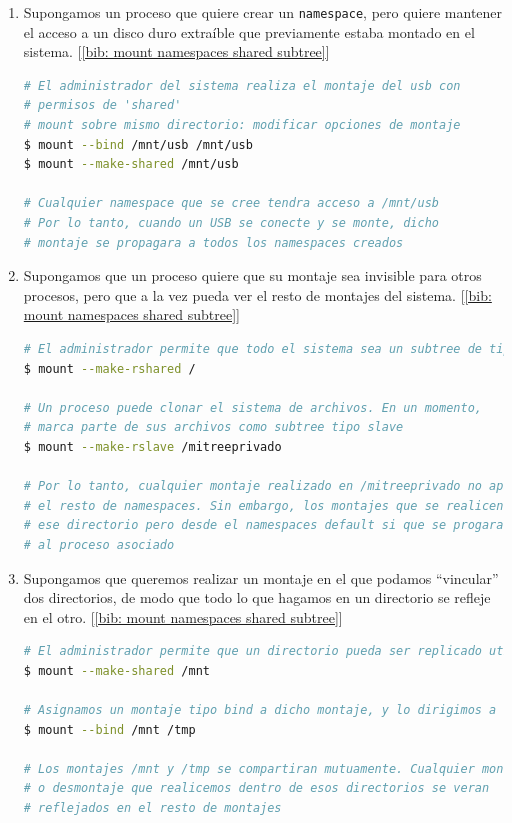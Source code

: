 \documentclass[a4paper, oneside, 12pt]{book}
\begin{document}
	\begin{enumerate}
		\item Supongamos un proceso que quiere crear un \texttt{namespace}, pero quiere mantener el acceso a un disco duro extraíble que previamente estaba montado en el sistema. [\ref{bib: mount namespaces shared subtree}]
		
		\begin{lstlisting}[language=bash, caption={Caso de uso de \texttt{shared subtree}}]
# El administrador del sistema realiza el montaje del usb con 
# permisos de 'shared'
# mount sobre mismo directorio: modificar opciones de montaje
$ mount --bind /mnt/usb /mnt/usb
$ mount --make-shared /mnt/usb
			
# Cualquier namespace que se cree tendra acceso a /mnt/usb
# Por lo tanto, cuando un USB se conecte y se monte, dicho 
# montaje se propagara a todos los namespaces creados
		\end{lstlisting}
	
		\item Supongamos que un proceso quiere que su montaje sea invisible para otros procesos, pero que a la vez pueda ver el resto de montajes del sistema. [\ref{bib: mount namespaces shared subtree}]
		
		\begin{lstlisting}[language=bash, caption={Caso de uso de \texttt{slave mount}}]
# El administrador permite que todo el sistema sea un subtree de tipo shared
$ mount --make-rshared /
			
# Un proceso puede clonar el sistema de archivos. En un momento, 
# marca parte de sus archivos como subtree tipo slave
$ mount --make-rslave /mitreeprivado
			
# Por lo tanto, cualquier montaje realizado en /mitreeprivado no aparecera en 
# el resto de namespaces. Sin embargo, los montajes que se realicen en 
# ese directorio pero desde el namespaces default si que se progaran 
# al proceso asociado
		\end{lstlisting}
	
		\item Supongamos que queremos realizar un montaje en el que podamos ``vincular'' dos directorios, de modo que todo lo que hagamos en un directorio se refleje en el otro. [\ref{bib: mount namespaces shared subtree}]
		
		\begin{lstlisting}[language=bash, caption={Caso de uso de \texttt{bind} y \texttt{shared subtree}}]
# El administrador permite que un directorio pueda ser replicado utilizando el tipo shared
$ mount --make-shared /mnt

# Asignamos un montaje tipo bind a dicho montaje, y lo dirigimos a otro directorio
$ mount --bind /mnt /tmp

# Los montajes /mnt y /tmp se compartiran mutuamente. Cualquier montaje 
# o desmontaje que realicemos dentro de esos directorios se veran
# reflejados en el resto de montajes
		\end{lstlisting}

	\end{enumerate}
\end{document}
